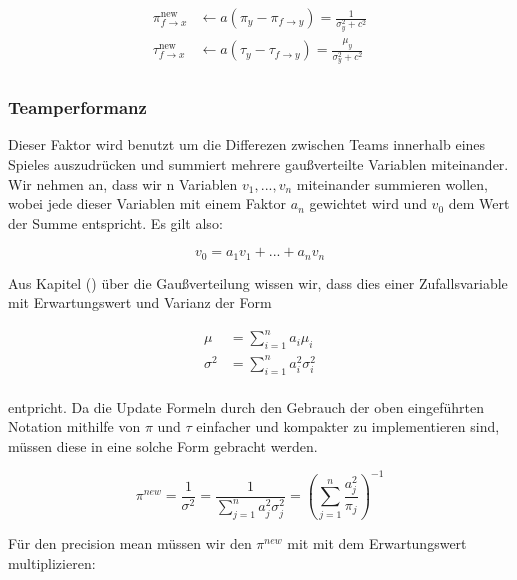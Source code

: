 \documentclass[12pt,a4paper]{scrartcl}
\numberwithin{equation}{section}
\begin{document}
  \begin{equation}
   \begin{split}
      \pi_{f \rightarrow x}^{\text{new}} &\leftarrow a(\pi_y - \pi_{f \rightarrow y}) = \frac{1}{\sigma_y^2 + c^2} \\
      \tau_{f \rightarrow x}^{\text{new}} &\leftarrow a(\tau_y - \tau_{f \rightarrow y}) = \frac{\mu_y}{\sigma_y^2 + c^2} \\
   \end{split}
  \end{equation}

  \subsubsection{Teamperformanz}
  Dieser Faktor wird benutzt um die Differezen zwischen Teams innerhalb eines Spieles auszudrücken und summiert mehrere gaußverteilte Variablen miteinander.
  Wir nehmen an, dass wir n Variablen $v_1,...,v_n$ miteinander summieren wollen, wobei jede dieser Variablen mit einem Faktor $a_n$ gewichtet wird und $v_0$ dem Wert der
  Summe entspricht. Es gilt also: 
  
  \begin{equation}
   v_0 = a_1v_1 + ... + a_nv_n 
  \end{equation}
  
  Aus Kapitel () über die Gaußverteilung wissen wir, dass dies einer Zufallsvariable mit Erwartungswert und Varianz der Form
  
  \begin{equation}
   \begin{split}
   \mu &= \sum_{i = 1}^n a_i \mu_i \\
   \sigma^2 &= \sum_{i = 1}^n a_i^2\sigma_i^2 \\ 
   \end{split}
  \end{equation}
  
  entpricht. Da die Update Formeln durch den Gebrauch der oben eingeführten Notation mithilfe von $\pi$ und $\tau$ einfacher und kompakter zu implementieren sind, 
  müssen diese in eine solche Form gebracht werden. 
  
  \begin{equation}
   \pi^{new} = \frac{1}{\sigma^2} = \frac{1}{\sum_{j=1}^{n} a_j^2 \sigma_j^2} = (\sum_{j=1}^n \frac{a_j^2}{\pi_j})^{-1}
  \end{equation}

  Für den precision mean müssen wir den $\pi^{new}$ mit mit dem Erwartungswert multiplizieren: 
  
\end{document}
